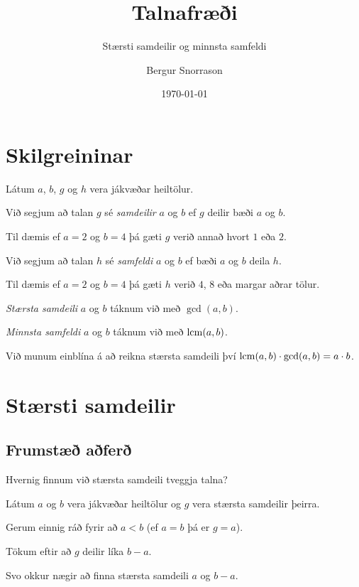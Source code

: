 \title{Talnafræði}
\subtitle{Stærsti samdeilir og minnsta samfeldi}
\author{Bergur Snorrason}
\date{\today}



\frame{\titlepage}

\section{Skilgreininar}
{
    {
        \item<1-> Látum $a$, $b$, $g$ og $h$ vera jákvæðar heiltölur.
        \item<2-> Við segjum að talan $g$ sé \emph{samdeilir} $a$ og $b$ ef $g$ deilir bæði $a$ og $b$.
        \item<3-> Til dæmis ef $a = 2$ og $b = 4$ þá gæti $g$ verið annað hvort $1$ eða $2$.
        \item<4-> Við segjum að talan $h$ sé \emph{samfeldi} $a$ og $b$ ef bæði $a$ og $b$ deila $h$.
        \item<5-> Til dæmis ef $a = 2$ og $b = 4$ þá gæti $h$ verið $4$, $8$ eða margar aðrar tölur.
        \item<6-> \emph{Stærsta samdeili} $a$ og $b$ táknum við með $\gcd(a, b)$.
        \item<7-> \emph{Minnsta samfeldi} $a$ og $b$ táknum við með $\operatorname{lcm}(a, b)$.
        \item<8-> Við munum einblína á að reikna stærsta samdeili því $\operatorname{lcm}(a, b) \cdot \gcd(a, b) = a \cdot b$.
    }
}

\section{Stærsti samdeilir}
\subsection{Frumstæð aðferð}
{
    {
        \item<1-> Hvernig finnum við stærsta samdeili tveggja talna?
        \item<2-> Látum $a$ og $b$ vera jákvæðar heiltölur og $g$ vera stærsta samdeilir þeirra.
        \item<3-> Gerum einnig ráð fyrir að $a < b$ (ef $a = b$ þá er $g = a$).
        \item<4-> Tökum eftir að $g$ deilir líka $b - a$.
        \item<5-> Svo okkur nægir að finna stærsta samdeili $a$ og $b - a$.
        \item<6->[] 
    }
}

